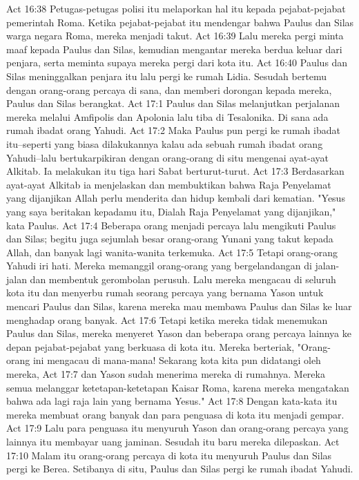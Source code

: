 Act 16:38  Petugas-petugas polisi itu melaporkan hal itu kepada pejabat-pejabat pemerintah Roma. Ketika pejabat-pejabat itu mendengar bahwa Paulus dan Silas warga negara Roma, mereka menjadi takut.
Act 16:39  Lalu mereka pergi minta maaf kepada Paulus dan Silas, kemudian mengantar mereka berdua keluar dari penjara, serta meminta supaya mereka pergi dari kota itu.
Act 16:40  Paulus dan Silas meninggalkan penjara itu lalu pergi ke rumah Lidia. Sesudah bertemu dengan orang-orang percaya di sana, dan memberi dorongan kepada mereka, Paulus dan Silas berangkat.
Act 17:1  Paulus dan Silas melanjutkan perjalanan mereka melalui Amfipolis dan Apolonia lalu tiba di Tesalonika. Di sana ada rumah ibadat orang Yahudi.
Act 17:2  Maka Paulus pun pergi ke rumah ibadat itu--seperti yang biasa dilakukannya kalau ada sebuah rumah ibadat orang Yahudi--lalu bertukarpikiran dengan orang-orang di situ mengenai ayat-ayat Alkitab. Ia melakukan itu tiga hari Sabat berturut-turut.
Act 17:3  Berdasarkan ayat-ayat Alkitab ia menjelaskan dan membuktikan bahwa Raja Penyelamat yang dijanjikan Allah perlu menderita dan hidup kembali dari kematian. "Yesus yang saya beritakan kepadamu itu, Dialah Raja Penyelamat yang dijanjikan," kata Paulus.
Act 17:4  Beberapa orang menjadi percaya lalu mengikuti Paulus dan Silas; begitu juga sejumlah besar orang-orang Yunani yang takut kepada Allah, dan banyak lagi wanita-wanita terkemuka.
Act 17:5  Tetapi orang-orang Yahudi iri hati. Mereka memanggil orang-orang yang bergelandangan di jalan-jalan dan membentuk gerombolan perusuh. Lalu mereka mengacau di seluruh kota itu dan menyerbu rumah seorang percaya yang bernama Yason untuk mencari Paulus dan Silas, karena mereka mau membawa Paulus dan Silas ke luar menghadap orang banyak.
Act 17:6  Tetapi ketika mereka tidak menemukan Paulus dan Silas, mereka menyeret Yason dan beberapa orang percaya lainnya ke depan pejabat-pejabat yang berkuasa di kota itu. Mereka berteriak, "Orang-orang ini mengacau di mana-mana! Sekarang kota kita pun didatangi oleh mereka,
Act 17:7  dan Yason sudah menerima mereka di rumahnya. Mereka semua melanggar ketetapan-ketetapan Kaisar Roma, karena mereka mengatakan bahwa ada lagi raja lain yang bernama Yesus."
Act 17:8  Dengan kata-kata itu mereka membuat orang banyak dan para penguasa di kota itu menjadi gempar.
Act 17:9  Lalu para penguasa itu menyuruh Yason dan orang-orang percaya yang lainnya itu membayar uang jaminan. Sesudah itu baru mereka dilepaskan.
Act 17:10  Malam itu orang-orang percaya di kota itu menyuruh Paulus dan Silas pergi ke Berea. Setibanya di situ, Paulus dan Silas pergi ke rumah ibadat Yahudi.

